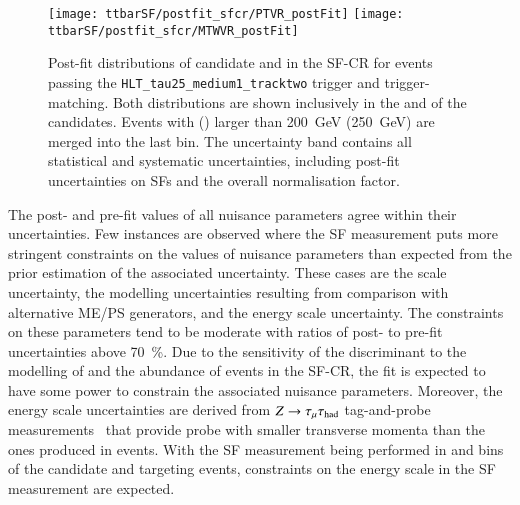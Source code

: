 \begin{figure}[htbp]
  \centering

  \texttt{[image: ttbarSF/postfit\_sfcr/PTVR\_postFit]}
  \texttt{[image: ttbarSF/postfit\_sfcr/MTWVR\_postFit]}

  \caption{Post-fit distributions of \tauhadvis candidate \pT and \mTW in the
    SF-CR for events passing the \texttt{HLT\_tau25\_medium1\_tracktwo} trigger
    and trigger-matching. Both distributions are shown inclusively in the
    \Ntracks and \pT of the \tauhadvis candidates. Events with \tauhadvis \pT
    (\mTW) larger than \SI{200}{\GeV} (\SI{250}{\GeV}) are merged into the last
    bin. The uncertainty band contains all statistical and systematic
    uncertainties, including post-fit uncertainties on \faketauhadvis SFs and
    the overall \ttbar normalisation factor.}%
  \label{fig:ttbarSF_postfit_ptmtw}
\end{figure}

The post- and pre-fit values of all nuisance parameters agree within their
uncertainties. Few instances are observed where the SF measurement puts more
stringent constraints on the values of nuisance parameters than expected from
the prior estimation of the associated uncertainty. These cases are the
\pTmissAbs scale uncertainty, the \ttbar modelling uncertainties resulting from
comparison with alternative ME/PS generators, and the \tauhadvis energy scale
uncertainty. The constraints on these parameters tend to be moderate with ratios
of post- to pre-fit uncertainties above \SI{70}{\percent}. Due to the
sensitivity of the \mTW discriminant to the modelling of \pTmissAbs and the
abundance of \ttbar events in the SF-CR, the fit is expected to have some power
to constrain the associated nuisance parameters. Moreover, the \tauhadvis energy
scale uncertainties are derived from $Z \rightarrow \tau_{\mu} \tau_{\text{had}}$ tag-and-probe
measurements~\cite{ATLAS-CONF-2017-029} that provide probe \tauhadvis with
smaller transverse momenta than the ones produced in \ttbar events. With the SF
measurement being performed in \Ntracks and \pT bins of the \tauhadvis candidate
and targeting \ttbar events, constraints on the \tauhadvis energy scale in the
SF measurement are expected.


